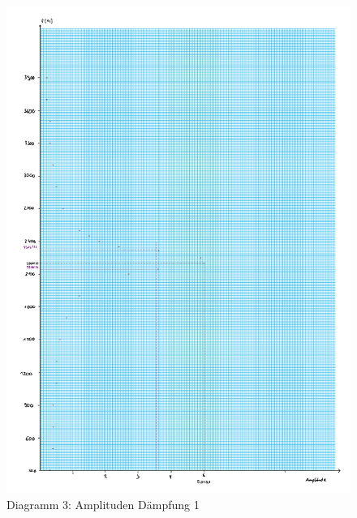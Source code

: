 \begin{figure}[h!]
    \centering
    \includegraphics[page=3, width=1\textwidth,]{Dias13.pdf}
    \caption{Diagramm 3: Amplituden Dämpfung 1}
\end{figure}
\newpage
